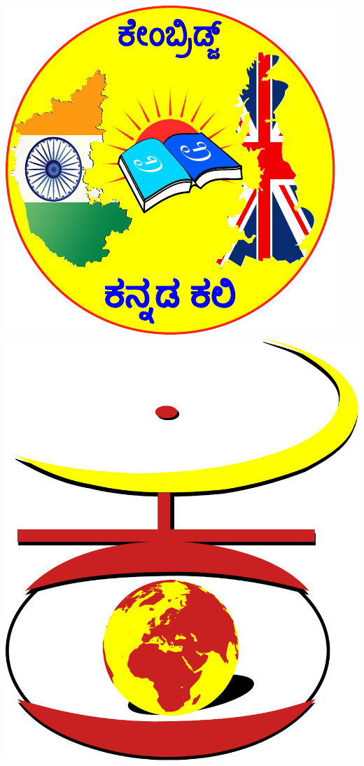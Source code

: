 \begin{titlepage}
	\vspace{3cm} %
	\includegraphics[scale=0.4]{KKali_logo.pdf}
	\hspace{2cm}
	\includegraphics[scale=0.19]{VishvaKannadaLogo.pdf}
	\vfill
	

\end{titlepage}
